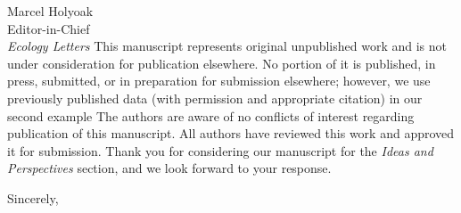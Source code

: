 \documentclass[11pt]{letter}
\makeatletter
\renewcommand{\closing}[1]{\par\nobreak\vspace{\parskip}%
  \stopbreaks
  \noindent
  \ifx\@empty\fromaddress\else
  \hspace*{\longindentation}\fi
  \parbox{\indentedwidth}{\raggedright
       \ignorespaces #1\\[1\medskipamount]%
       \ifx\@empty\fromsig
           \fromname
       \else \fromsig \fi\strut}%
   \par}
\makeatother
\begin{document}
\begin{letter}{Marcel Holyoak \\ 
	Editor-in-Chief \\
	\emph{Ecology Letters}
}
This manuscript represents original unpublished work and is not under consideration for publication elsewhere. 
No portion of it is published, in press, submitted, or in preparation for submission elsewhere; however, we use previously published data (with permission and appropriate citation) in our second example
The authors are aware of no conflicts of interest regarding publication of this manuscript. 
All authors have reviewed this work and approved it for submission. 
Thank you for considering our manuscript for the \emph{Ideas and Perspectives} section, and we look forward to your response.

\closing{Sincerely,}

\end{letter}
\end{document}
